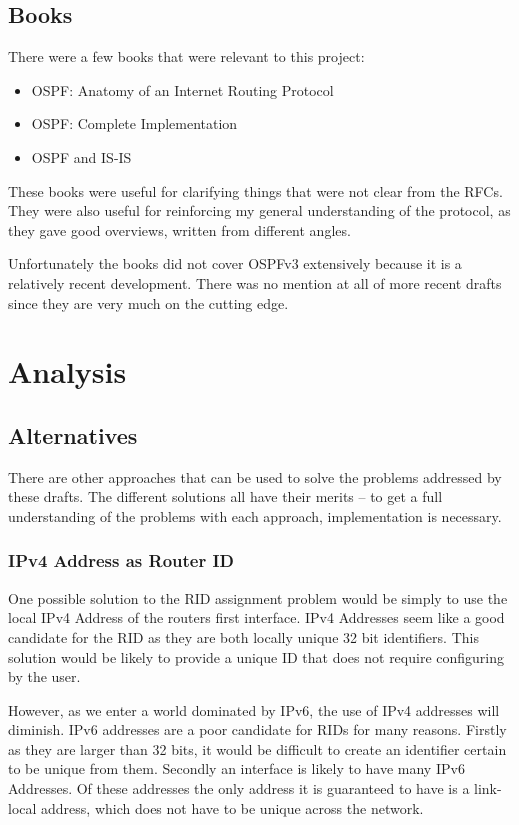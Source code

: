 \documentclass[12pt,a4paper,twoside]{report}
\begin{document}
\section{Books}
There were a few books that were relevant to this project:
\begin{itemize}
  \item OSPF: Anatomy of an Internet Routing Protocol \cite{OSPFAIRP}
  \item OSPF: Complete Implementation \cite{OSPFCI}
  \item OSPF and IS-IS \cite{OSPFvsISIS}
\end{itemize}

These books were useful for clarifying things that were not clear from the
RFCs. They were also useful for reinforcing my general understanding of the
protocol, as they gave good overviews, written from different angles. 

Unfortunately the books did not cover OSPFv3 extensively because it is a
relatively recent development. There was no mention at all of more recent
drafts since they are very much on the cutting edge.

\chapter{Analysis}
\section{Alternatives}
There are other approaches that can be used to solve the problems addressed by
these drafts. The different solutions all have their merits -- to get a full
understanding of the problems with each approach, implementation is necessary.

\subsection{IPv4 Address as Router ID}
One possible solution to the RID assignment problem would be simply to use the
local IPv4 Address of the routers first interface. IPv4 Addresses seem like a
good candidate for the RID as they are both locally unique 32 bit identifiers.
This solution would be likely to provide a unique ID that does not require
configuring by the user.
 
However, as we enter a world dominated by IPv6, the use of IPv4 addresses will
diminish. IPv6 addresses are a poor candidate for RIDs for many reasons.
Firstly as they are larger than 32 bits, it would be difficult to create an
identifier certain to be unique from them. Secondly an interface is likely to
have many IPv6 Addresses. Of these addresses the only address it is guaranteed
to have is a link-local address, which does not have to be unique across the
network. 
\end{document}
